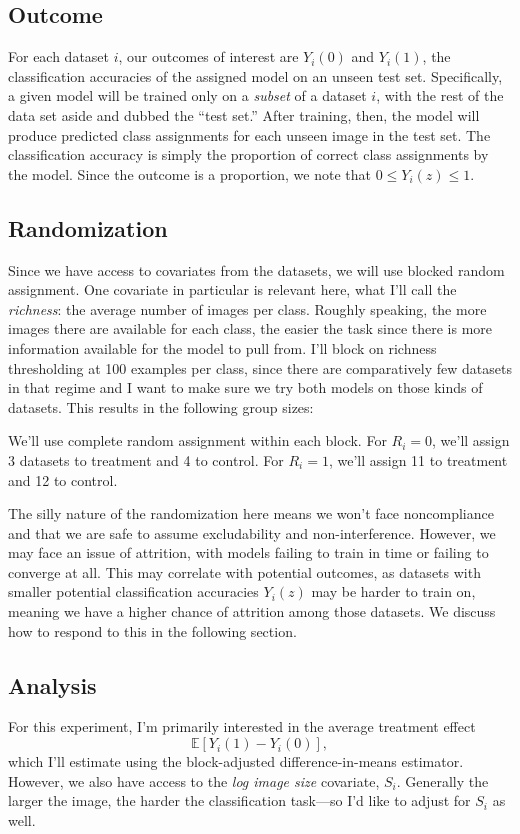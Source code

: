 \documentclass[11pt, oneside]{article}
\begin{document}
\subsection*{Outcome}
For each dataset $i$, our outcomes of interest are $Y_i(0)$ and $Y_i(1)$, the
classification accuracies of the assigned model on an unseen test set.
Specifically, a given model will be trained only on a \emph{subset} of a
dataset $i$, with the rest of the data set aside and dubbed the ``test set.''
After training, then, the model will produce predicted class assignments for
each unseen image in the test set. The classification accuracy is simply the
proportion of correct class assignments by the model. Since the outcome is a proportion,
we note that $0 \leq Y_i(z) \leq 1$.

\subsection*{Randomization}
Since we have access to covariates from the datasets, we will use blocked
random assignment. One covariate in particular is relevant here, what I'll call
the \emph{richness}: the average number of images per class. Roughly speaking,
the more images there are available for each class, the easier the task since
there is more information available for the model to pull from. I'll block on
richness thresholding at 100 examples per class, since there are comparatively
few datasets in that regime and I want to make sure we try both models on those
kinds of datasets. This results in the following group sizes:



We'll use complete random assignment within each block. For $R_i = 0$, we'll
assign 3 datasets to treatment and 4 to control. For $R_i = 1$, we'll assign 11
to treatment and 12 to control.

The silly nature of the randomization here means we won't face noncompliance
and that we are safe to assume excludability and non-interference. However, we
may face an issue of attrition, with models failing to train in time or failing
to converge at all. This may correlate with potential outcomes, as datasets
with smaller potential classification accuracies $Y_i(z)$ may be harder to train on,
meaning we have a higher chance of attrition among those datasets. We discuss
how to respond to this in the following section.

\subsection*{Analysis}
For this experiment, I'm primarily interested in the average treatment effect
\[
    \mathbb{E}[Y_i(1) - Y_i(0)]
,\] 
which I'll estimate using the block-adjusted difference-in-means estimator.
However, we also have access to the \emph{log image size} covariate, $S_i$.
Generally the larger the image, the harder the classification task—so I'd like
to adjust for $S_i$ as well.
\end{document}
